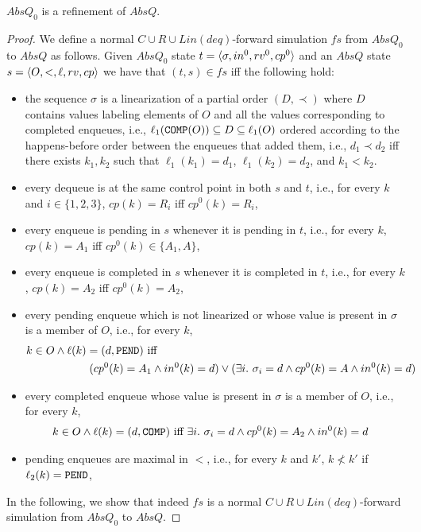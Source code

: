 \begin{lemma} 
$AbsQ_0$ is a refinement of $AbsQ$.
\end{lemma}
\begin{proof}
We define a normal $C\cup R\cup Lin(deq)$-forward simulation $fs$ from $AbsQ_0$ to $AbsQ$ as follows. 
Given $AbsQ_0$ state $t=\langle {\sigma,in^0,rv^0,cp^0} \rangle$ and an $AbsQ$ state $s=\langle {O,<,\ell,rv,cp} \rangle$ we have that $(t,s)\in fs$ iff the following hold:
\begin{itemize}
	\item the sequence $\sigma$ is a linearization of a partial order $(D,\prec)$ where $D$ contains values labeling elements of $O$ and all the values corresponding to completed enqueues, i.e., $\ell_1({\tt COMP}(O))\subseteq D\subseteq \ell_1(O)$ ordered according to the happens-before order between the enqueues that added them, i.e., $d_1\prec d_2$ if{f} there exists $k_1,k_2$ such that $\ell_1(k_1)=d_1$, $\ell_1(k_2)=d_2$, and $k_1 < k_2$.
	\item every dequeue is at the same control point in both $s$ and $t$, i.e., for every $k$ and $i\in \{1,2,3\}$, $cp(k)=R_i$ iff $cp^0(k)=R_i$,
	\item every enqueue is pending in $s$ whenever it is pending in $t$, i.e., for every $k$, $cp(k)=A_1$ iff $cp^0(k)\in \{A_1,A\}$,
	\item every enqueue is completed in $s$ whenever it is completed in $t$, i.e., for every $k$, $cp(k)=A_2$ iff $cp^0(k) = A_2$,
	\item every pending enqueue which is not linearized or whose value is present in $\sigma$ is a member of $O$, i.e., for every $k$, 
	\begin{align*}
	&k\in O\land \ell(k)=(d,{\tt PEND})\mbox{ iff } \\
	&\hspace{2cm}(cp^0(k)=A_1\land in^0(k)=d)\vee (\exists i.\ \sigma_i =d\land cp^0(k)=A\land in^0(k)=d)
	\end{align*}
	\item every completed enqueue whose value is present in $\sigma$ is a member of $O$, i.e., for every $k$, 
	\begin{align*}
	&k\in O\land \ell(k)=(d,{\tt COMP})\mbox{ iff } \exists i.\ \sigma_i =d\land cp^0(k)=A_2\land in^0(k)=d
	\end{align*}
	\item pending enqueues are maximal in $<$, i.e., for every $k$ and $k'$, $k \not< k'$ if $\ell_2(k)={\tt PEND}$,
\end{itemize}
In the following, we show that indeed $fs$ is a normal $C\cup R\cup Lin(deq)$-forward simulation from $AbsQ_0$ to $AbsQ$.


\end{proof}
